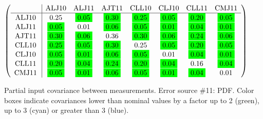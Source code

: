 \begin{table}[H]
\scriptsize
\begin{center}
\renewcommand{\arraystretch}{1.1}
\begin{math}\left(\begin{array}{c|ccccccc}
 & \mathrm{ALJ10} & 
\mathrm{ALJ11} & 
\mathrm{AJT11} & 
\mathrm{CLL10} & 
\mathrm{CLJ10} & 
\mathrm{CLL11} & 
\mathrm{CMJ11} \\
\hline
\mathrm{ALJ10} \hspace*{2pt} &       0.25 &  \colorbox{Green1}{$      0.05$} &  \colorbox{Green1}{$      0.30$} &  \colorbox{Green1}{$      0.25$} &  \colorbox{Green1}{$      0.05$} &  \colorbox{Green1}{$      0.20$} &  \colorbox{Green1}{$      0.05$} \\
\mathrm{ALJ11} \hspace*{2pt} &  \colorbox{Green1}{$      0.05$} &       0.01 &  \colorbox{Green1}{$      0.06$} &  \colorbox{Green1}{$      0.05$} &  \colorbox{Green1}{$      0.01$} &  \colorbox{Green1}{$      0.04$} &  \colorbox{Green1}{$      0.01$} \\
\mathrm{AJT11} \hspace*{2pt} &  \colorbox{Green1}{$      0.30$} &  \colorbox{Green1}{$      0.06$} &       0.36 &  \colorbox{Green1}{$      0.30$} &  \colorbox{Green1}{$      0.06$} &  \colorbox{Green1}{$      0.24$} &  \colorbox{Green1}{$      0.06$} \\
\mathrm{CLL10} \hspace*{2pt} &  \colorbox{Green1}{$      0.25$} &  \colorbox{Green1}{$      0.05$} &  \colorbox{Green1}{$      0.30$} &       0.25 &  \colorbox{Green1}{$      0.05$} &  \colorbox{Green1}{$      0.20$} &  \colorbox{Green1}{$      0.05$} \\
\mathrm{CLJ10} \hspace*{2pt} &  \colorbox{Green1}{$      0.05$} &  \colorbox{Green1}{$      0.01$} &  \colorbox{Green1}{$      0.06$} &  \colorbox{Green1}{$      0.05$} &       0.01 &  \colorbox{Green1}{$      0.04$} &  \colorbox{Green1}{$      0.01$} \\
\mathrm{CLL11} \hspace*{2pt} &  \colorbox{Green1}{$      0.20$} &  \colorbox{Green1}{$      0.04$} &  \colorbox{Green1}{$      0.24$} &  \colorbox{Green1}{$      0.20$} &  \colorbox{Green1}{$      0.04$} &       0.16 &  \colorbox{Green1}{$      0.04$} \\
\mathrm{CMJ11} \hspace*{2pt} &  \colorbox{Green1}{$      0.05$} &  \colorbox{Green1}{$      0.01$} &  \colorbox{Green1}{$      0.06$} &  \colorbox{Green1}{$      0.05$} &  \colorbox{Green1}{$      0.01$} &  \colorbox{Green1}{$      0.04$} &       0.01 \\
\end{array}\right)\end{math}
\caption{Partial input covariance between measurements. Error source \#11: PDF. Color boxes indicate covariances lower than nominal values by a factor up to 2 (green), up to 3 (cyan) or greater than 3 (blue).}
\renewcommand{\arraystretch}{1}
\end{center}
\end{table}

